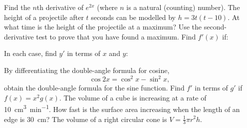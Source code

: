 \begin{questions}
  \questioM Find the $ n$th derivative of $ e^{2x} $ (where $ n $ is a natural (counting) number).
  \questioE The height of a projectile after $ t $ seconds can be modelled by $ h = 3t(t - 10) $. At what time
            is the height of the projectile at a maximum? Use the second-derivative test to prove that you have
            found a maximum.
  \questioM Find $ f'(x) $ if:
  \questioM In each case, find $ y' $ in terms of $ x $ and $ y $:
  \questioM By differentiating the double-angle formula for cosine,
            \begin{displaymath}
              \cos 2x = \cos^2 x - \sin^2 x,
            \end{displaymath}
            obtain the double-angle formula for the sine function.
  \questioM Find $ f' $ in terms of $ g' $ if $ f(x) = x^2 g(x) $.
  \questioM The volume of a cube is increasing at a rate of \SI{10}{\centi\metre\cubed\per\minute}. How fast is the surface
            area increasing when the length of an edge is \SI{30}{\centi\metre}?
  \questioM The volume of a right circular cone is $ V = \frac{1}{3} \pi r^2 h $.
    \begin{parts}

\end{parts}
\end{questions}
